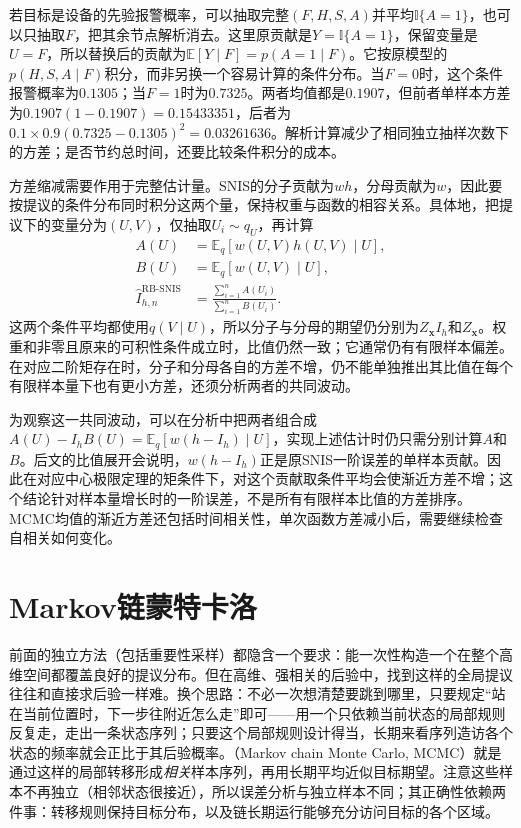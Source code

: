 若目标是设备的先验报警概率，可以抽取完整$(F,H,S,A)$并平均$\mathbb{I}\{A=1\}$，也可以只抽取$F$，把其余节点解析消去。这里原贡献是$Y=\mathbb{I}\{A=1\}$，保留变量是$U=F$，所以替换后的贡献为$\mathbb{E}[Y\mid F]=p(A=1\mid F)$。它按原模型的$p(H,S,A\mid F)$积分，而非另换一个容易计算的条件分布。当$F=0$时，这个条件报警概率为$0.1305$；当$F=1$时为$0.7325$。两者均值都是$0.1907$，但前者单样本方差为$0.1907(1-0.1907)=0.15433351$，后者为$0.1\times0.9(0.7325-0.1305)^2=0.03261636$。解析计算减少了相同独立抽样次数下的方差；是否节约总时间，还要比较条件积分的成本。

方差缩减需要作用于完整估计量。SNIS的分子贡献为$wh$，分母贡献为$w$，因此要按提议的条件分布同时积分这两个量，保持权重与函数的相容关系。具体地，把提议下的变量分为$(U,V)$，仅抽取$U_i\sim q_U$，再计算
\[
  \begin{aligned}
    A(U)&=\mathbb{E}_q[w(U,V)h(U,V)\mid U],\\
    B(U)&=\mathbb{E}_q[w(U,V)\mid U],\\
    \widehat I_{h,n}^{\mathrm{RB\text{-}SNIS}}
      &=\frac{\sum_{i=1}^{n}A(U_i)}{\sum_{i=1}^{n}B(U_i)}.
  \end{aligned}
\]
这两个条件平均都使用$q(V\mid U)$，所以分子与分母的期望仍分别为$Z_{\bm{x}}I_h$和$Z_{\bm{x}}$。权重和非零且原来的可积性条件成立时，比值仍然一致；它通常仍有有限样本偏差。在对应二阶矩存在时，分子和分母各自的方差不增，仍不能单独推出其比值在每个有限样本量下也有更小方差，还须分析两者的共同波动。

为观察这一共同波动，可以在分析中把两者组合成$A(U)-I_hB(U)=\mathbb{E}_q[w(h-I_h)\mid U]$，实现上述估计时仍只需分别计算$A$和$B$。后文的比值展开会说明，$w(h-I_h)$正是原SNIS一阶误差的单样本贡献。因此在对应中心极限定理的矩条件下，对这个贡献取条件平均会使渐近方差不增；这个结论针对样本量增长时的一阶误差，不是所有有限样本比值的方差排序。MCMC均值的渐近方差还包括时间相关性，单次函数方差减小后，需要继续检查自相关如何变化。

\section{Markov链蒙特卡洛}
\label{sec:pgm-sampling-mcmc}

前面的独立方法（包括重要性采样）都隐含一个要求：能一次性构造一个在整个高维空间都覆盖良好的提议分布。但在高维、强相关的后验中，找到这样的全局提议往往和直接求后验一样难。换个思路：不必一次想清楚要跳到哪里，只要规定“站在当前位置时，下一步往附近怎么走”即可——用一个只依赖当前状态的局部规则反复走，走出一条状态序列；只要这个局部规则设计得当，长期来看序列造访各个状态的频率就会正比于其后验概率。（Markov chain Monte Carlo, MCMC）就是通过这样的局部转移形成\emph{相关}样本序列，再用长期平均近似目标期望。注意这些样本不再独立（相邻状态很接近），所以误差分析与独立样本不同；其正确性依赖两件事：转移规则保持目标分布，以及链长期运行能够充分访问目标的各个区域。

